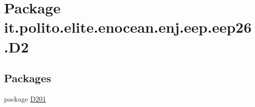 \hypertarget{namespaceit_1_1polito_1_1elite_1_1enocean_1_1enj_1_1eep_1_1eep26_1_1_d2}{}\section{Package it.\+polito.\+elite.\+enocean.\+enj.\+eep.\+eep26.\+D2}
\label{namespaceit_1_1polito_1_1elite_1_1enocean_1_1enj_1_1eep_1_1eep26_1_1_d2}
\subsection*{Packages}
\begin{DoxyCompactItemize}
\item 
package \hyperlink{namespaceit_1_1polito_1_1elite_1_1enocean_1_1enj_1_1eep_1_1eep26_1_1_d2_1_1_d201}{D201}
\end{DoxyCompactItemize}
